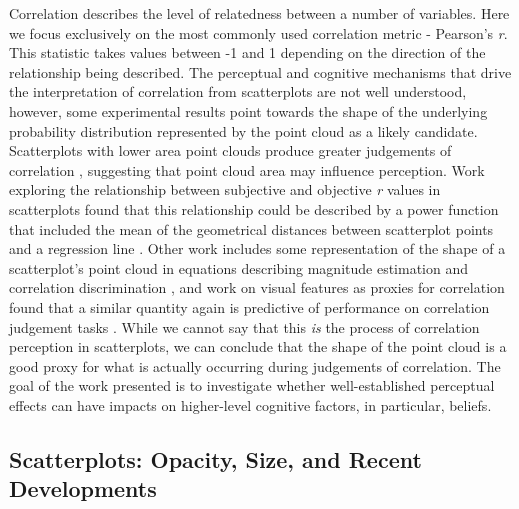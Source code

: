 \documentclass[sigconf]{acmart}
\begin{document}
Correlation describes the level of relatedness between a number of
variables. Here we focus exclusively on the most commonly used
correlation metric - Pearson's \emph{r}. This statistic takes values
between -1 and 1 depending on the direction of the relationship being
described. The perceptual and cognitive mechanisms that drive the
interpretation of correlation from scatterplots are not well understood,
however, some experimental results point towards the shape of the
underlying probability distribution represented by the point cloud as a
likely candidate. Scatterplots with lower area point clouds produce
greater judgements of correlation \citep{cleveland_1982}, suggesting
that point cloud area may influence perception. Work exploring the
relationship between subjective and objective \emph{r} values in
scatterplots found that this relationship could be described by a power
function that included the mean of the geometrical distances between
scatterplot points and a regression line \citep{meyer_1997}. Other work
includes some representation of the shape of a scatterplot's point cloud
in equations describing magnitude estimation and correlation
discrimination \citep{meyer_1997, rensink_2017}, and work on visual
features as proxies for correlation found that a similar quantity again
is predictive of performance on correlation judgement tasks
\citep{yang_2019}. While we cannot say that this \emph{is} the process
of correlation perception in scatterplots, we can conclude that the
shape of the point cloud is a good proxy for what is actually occurring
during judgements of correlation. The goal of the work presented is to
investigate whether well-established perceptual effects can have impacts
on higher-level cognitive factors, in particular, beliefs.

\subsection{Scatterplots: Opacity, Size, and Recent
Developments}\label{sec-scatterplots}
\end{document}

